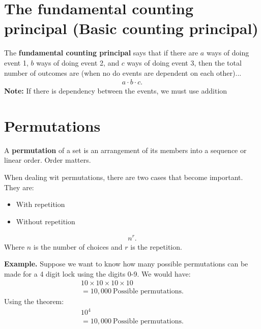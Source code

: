 \documentclass{report}
\begin{document}
    \section{\LARGE The fundamental counting principal (Basic counting principal)}
    \bigbreak \noindent 
    \smallbreak \noindent
    \begin{definition}
        The \textbf{fundamental counting principal} says that if there are $a$ ways of doing event 1, $b$ ways of doing event 2, and $c$ ways of doing event 3, then the total number of outcomes are (when no do events are dependent on each other)...
        \begin{align*}
            a \cdot b \cdot c
        .\end{align*}
        \bigbreak \noindent 
        \textbf{Note:} If there is dependency between the events, we must use addition
    \end{definition}

    \pagebreak \bigbreak \noindent 
    \section{\LARGE Permutations}
    \bigbreak \noindent 
    \smallbreak \noindent
    \begin{definition}
        A \textbf{permutation} of a set is an arrangement of its members into a sequence or linear order. Order matters.
    \end{definition}
    \bigbreak \noindent 
    When dealing wit permutations, there are two cases that become important. They are:
    \begin{itemize}
        \item With repetition
        \item Without repetition
    \end{itemize}
    \bigbreak \noindent 
    \begin{thrm}
       \begin{align*}
           n^{r}
       .\end{align*} 
         Where $n$ is the number of choices and $r$ is the repetition.
    \end{thrm}
    \bigbreak \noindent 
    \textbf{Example.} Suppose we want to know how many possible permutations can be made for a 4 digit lock using the digits 0-9. We would have:
    \begin{align*}
        10 \times 10 \times 10 \times 10 \\
        = 10,000\ \text{Possible permutations}
    .\end{align*}
    \bigbreak \noindent 
    Using the theorem:
    \begin{align*}
        10^{4} \\
        = 10,000\ \text{Possible permutations}
    .\end{align*}
\end{document}
